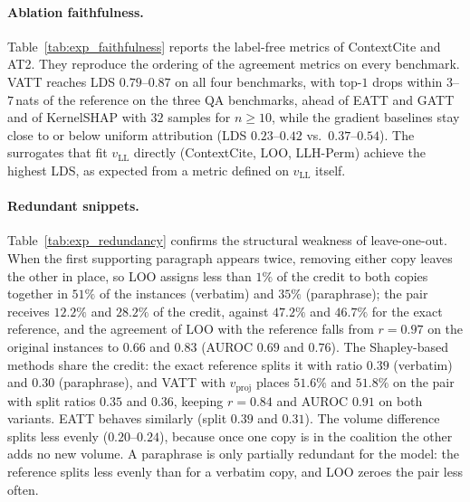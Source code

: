 \paragraph{Ablation faithfulness.}
Table~\ref{tab:exp_faithfulness} reports the label-free metrics of ContextCite and AT2. They reproduce the ordering of the agreement metrics on every benchmark. VATT reaches LDS $0.79$--$0.87$ on all four benchmarks, with top-$1$ drops within $3$--$7$\,nats of the reference on the three QA benchmarks, ahead of EATT and GATT and of KernelSHAP with $32$ samples for $n \ge 10$, while the gradient baselines stay close to or below uniform attribution (LDS $0.23$--$0.42$ vs.\ $0.37$--$0.54$). The surrogates that fit $v_{\text{LL}}$ directly (ContextCite, LOO, LLH-Perm) achieve the highest LDS, as expected from a metric defined on $v_{\text{LL}}$ itself.

\paragraph{Redundant snippets.}
Table~\ref{tab:exp_redundancy} confirms the structural weakness of leave-one-out. When the first supporting paragraph appears twice, removing either copy leaves the other in place, so LOO assigns less than $1\%$ of the credit to both copies together in $51\%$ of the instances (verbatim) and $35\%$ (paraphrase); the pair receives $12.2\%$ and $28.2\%$ of the credit, against $47.2\%$ and $46.7\%$ for the exact reference, and the agreement of LOO with the reference falls from $r = 0.97$ on the original instances to $0.66$ and $0.83$ (AUROC $0.69$ and $0.76$). The Shapley-based methods share the credit: the exact reference splits it with ratio $0.39$ (verbatim) and $0.30$ (paraphrase), and VATT with $v_{\text{proj}}$ places $51.6\%$ and $51.8\%$ on the pair with split ratios $0.35$ and $0.36$, keeping $r = 0.84$ and AUROC $0.91$ on both variants. EATT behaves similarly (split $0.39$ and $0.31$). The volume difference splits less evenly ($0.20$--$0.24$), because once one copy is in the coalition the other adds no new volume. A paraphrase is only partially redundant for the model: the reference splits less evenly than for a verbatim copy, and LOO zeroes the pair less often.

